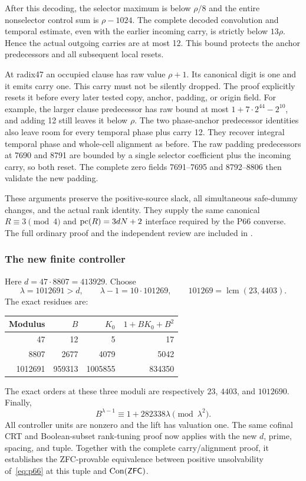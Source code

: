 After this decoding, the selector maximum is below $\rho/8$ and the
entire nonselector control sum is $\rho-1024$. The complete decoded
convolution and temporal estimate, even with the earlier incoming carry,
is strictly below $13\rho$. Hence the actual outgoing carries are at
most 12. This bound protects the anchor predecessors and all subsequent
local resets.

At radix47 an occupied clause has raw value $\rho+1$. Its canonical
digit is one and it emits carry one. This carry must not be silently
dropped. The proof explicitly resets it before every later tested copy,
anchor, padding, or origin field. For example, the larger clause
predecessor has raw bound at most $1+7\cdot2^{44}-2^{10}$, and adding
12 still leaves it below $\rho$. The two phase-anchor predecessor
identities also leave room for every temporal phase plus carry 12.
They recover integral temporal phase and whole-cell alignment as before.
The raw padding predecessors at 7690 and 8791 are bounded by a single
selector coefficient plus the incoming carry, so both reset. The complete
zero fields 7691--7695 and 8792--8806 then validate the new padding.

These arguments preserve the positive-source slack, all simultaneous
safe-dummy changes, and the actual rank identity. They supply the same
canonical $R\equiv3\pmod4$ and
$\operatorname{pc}(R)=3dN+2$ interface required by the P66 converse. The full ordinary
proof and the independent review are included in .

\subsubsection*{The new finite controller}

Here $d=47\cdot8807=413929$. Choose
\[
 \lambda=1012691>d,\qquad
 \lambda-1=10\cdot101269,
 \qquad101269=\operatorname{lcm}(23,4403).
\]
The exact residues are:
\begin{center}
\begin{tabular}{@{}rrrr@{}}
\toprule
Modulus & $B$ & $K_0$ & $1+BK_0+B^2$\\
\midrule
47 & 12 & 5 & 17\\
8807 & 2677 & 4079 & 5042\\
1012691 & 959313 & 1005855 & 834350\\
\bottomrule
\end{tabular}
\end{center}
The exact orders at these three moduli are respectively
$23$, $4403$, and $1012690$. Finally,
\[
 B^{\lambda-1}\equiv1+282338\lambda\pmod{\lambda^2}.
\]
All controller units are nonzero and the lift has valuation one. The
same cofinal CRT and Boolean-subset rank-tuning proof now applies with
the new $d$, prime, spacing, and tuple. Together with the complete
carry/alignment proof, it establishes the ZFC-provable equivalence
between positive unsolvability of~\eqref{eq:p66} at this tuple and
$\operatorname{Con}(\mathsf{ZFC})$.

